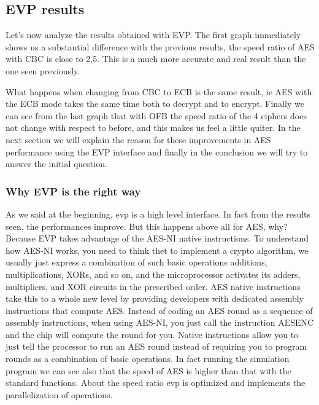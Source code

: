 \documentclass[11pt]{article}
\begin{document}
\subsection{EVP results}
Let's now analyze the results obtained with EVP.
The first graph immediately shows us a substantial difference with the previous results, the speed ratio of AES with CBC is close to 2,5. 
This is a much more accurate and real result than the one seen previously.

What happens when changing from CBC to ECB is the same result, ie AES with the ECB mode takes the same time both to decrypt and to encrypt.
Finally we can see from the last graph that with OFB the speed ratio of the 4 ciphers does not change with respect to before, and this makes 
us feel a little quiter. In the next section we will explain the reason for these improvements in AES performance using the EVP interface and finally in the 
conclusion we will try to answer the initial question.

\subsubsection{Why EVP is the right way}
As we said at the beginning, evp is a high level interface. In fact from the results seen, the performances improve.
But this happens above all for AES, why? Because EVP takes advantage of the AES-NI native instructions. To understand how AES-NI works, 
you need to think thet to implement a crypto algorithm, we usually just express a combination 
of such basic operations additions, multiplications, XORs, and so on, and the microprocessor activates its adders, multipliers, and XOR circuits 
in the prescribed order. AES native instructions take this to a whole new level by providing developers with dedicated assembly instructions that 
compute AES. Instead of coding an AES round as a sequence of assembly instructions, when using AES-NI, you just call the instruction AESENC and 
the chip will compute the round for you. Native instructions allow you to just tell the processor to run an AES round instead of requiring you to 
program rounds as a combination of basic operations.
In fact running the simulation program we can see also that the speed of AES is higher than that with the standard functions. 
About the speed ratio evp is optimized and implements the parallelization of operations.
\end{document}
